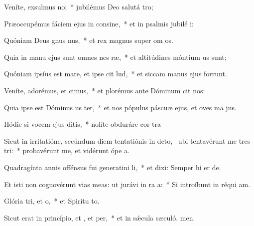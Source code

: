 \item Veníte, exsulmus no;~* jubilémus Deo salutá tro;
\item Præoccupémus fáciem ejus in consine,~* et in psalmis jubilé i:
\item Quóniam Deus gnus nus,~* et rex magnus super om os.
\item Quia in manu ejus sunt omnes nes ræ,~* et altitúdines móntium us sunt;
\item Quóniam ipsíus est mare, et ipse cit lud,~* et siccam manus ejus forrunt.
\item Veníte, adorémus, et cimus,~* et plorémus ante Dóminum  cit nos:
\item Quia ipse est Dóminus us ter,~* et nos pópulus páscuæ ejus, et oves ma jus.
\item Hódie si vocem ejus ditis,~* nolíte obduráre cor tra
\item Sicut in irritatióne, secúndum diem tentatiónis in deto,~\pscross{} ubi tentavérunt me tres tri:~* probavérunt me, et vidérunt ópe a.
\item Quadragínta annis offénsus fui generatini li,~* et dixi: Semper hi er de.
\item Et isti non cognovérunt vias meas: ut jurávi in ra a:~* Si introíbunt in réqui am.
\item Glória tri, et o,~* et Spirítu to.
\item Sicut erat in princípio, et , et per,~* et in sǽcula sæculó. men.
